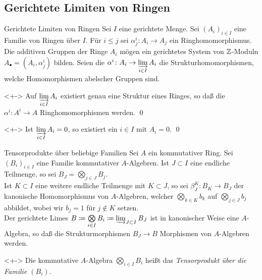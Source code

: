 \subsection{Gerichtete Limiten von Ringen}

\begin{frame}{Gerichtete Limiten von Ringen}
	Sei \(I\) eine gerichtete Menge. Sei \((A_i)_{i \in I}\) eine Familie von Ringen über \(I\).
	Für \(i \le j\) sei \(\alpha^i_j\colon A_i \to A_j\) ein Ringhomomorphismus. 
	Die additiven Gruppen der Ringe \(A_i\) mögen ein gerichtetes System von \(\mathbb Z\)-Moduln	
	\(A_\bullet = (A_i, \alpha^i_j)\) bilden.
	Seien die \(\alpha^i\colon A_i \to \varinjlim\limits_{i \in I} A_i\) die Strukturhomomorphismen,
	welche Homomorphismen abelscher Gruppen sind.
	\begin{proposition}<+->
		Auf \(\varinjlim\limits_{i \in I} A_i\) existiert genau eine Struktur eines Ringes, so daß die \(\alpha^i\colon A^i \to A\)
		Ringhomomorphismen werden.
		\qed
	\end{proposition}
	\begin{proposition}<+->
		Ist \(\varinjlim\limits_{i \in I} A_i = 0\), so existiert ein \(i \in I\) mit \(A_i = 0\).
		\qed
	\end{proposition}
\end{frame}

\begin{frame}{Tensorprodukte über beliebige Familien}
	Sei \(A\) ein kommutativer Ring. Sei \((B_i)_{i \in I}\) eine Familie kommutativer \(A\)-Algebren. Ist \(J \subset I\) eine
	endliche Teilmenge, so sei \(B_J = \bigotimes_{j \in J} B_j\).
	\\
	Ist \(K \subset I\) eine weitere endliche Teilmenge mit \(K \subset J\), so sei \(\beta^K_J\colon B_K \to B_J\) der kanonische
	Homomorphismus von \(A\)-Algebren, welcher \(\bigotimes\limits_{k \in K} b_k\) auf \(\bigotimes\limits_{j \in J} b_j\) abbildet,
	wobei wir \(b_j = 1\) für \(j \notin K\) setzen.
	\\
	Der gerichtete Limes \(B \coloneqq \bigotimes\limits_{i \in I} B_i \coloneqq \varinjlim_{J \subset I} B_J\) ist in kanonischer Weise
	eine \(A\)-
	Algebra, so daß die
	Strukturmorphismen \(B_J \to B\) Morphismen von \(A\)-Algebren werden.
	\begin{definition}<+->
		Die kommutative \(A\)-Algebra \(\bigotimes\limits_{i \in I} B_i\) heißt das \emph{Tensorprodukt über die Familie \((B_i)\)}.
	\end{definition}
\end{frame}

